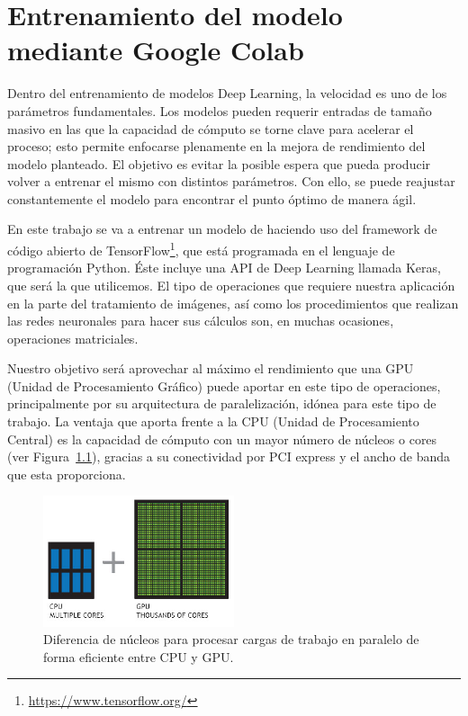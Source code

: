 \mbox{}


\chapter{Entrenamiento del modelo mediante Google Colab}
\label{ch:chapter2}
Dentro del entrenamiento de modelos Deep Learning, la velocidad es uno de los parámetros fundamentales.
Los modelos pueden requerir entradas de tamaño masivo en las que la capacidad de cómputo se torne clave para acelerar el proceso;
esto permite enfocarse plenamente en la mejora de rendimiento del modelo planteado.
El objetivo es evitar la posible espera que pueda producir volver a entrenar el mismo con distintos parámetros.
Con ello, se puede reajustar constantemente el modelo para encontrar el punto óptimo de manera ágil.

En este trabajo se va a entrenar un modelo de  haciendo uso del framework de código abierto de TensorFlow\footnote{\url{https://www.tensorflow.org/}}, que está programada en el lenguaje de programación Python.
Éste incluye una API de Deep Learning llamada Keras, que será la que utilicemos.
El tipo de operaciones que requiere nuestra aplicación en la parte del tratamiento de imágenes, así como los procedimientos que realizan las redes neuronales para hacer sus cálculos son, en muchas ocasiones,
operaciones matriciales.

Nuestro objetivo será aprovechar al máximo el rendimiento que una GPU (Unidad de Procesamiento Gráfico) puede aportar en este tipo de operaciones, principalmente por su arquitectura de paralelización, idónea para este tipo de trabajo.
La ventaja que aporta frente a la CPU (Unidad de Procesamiento Central) es la capacidad de cómputo con un mayor número de núcleos o cores (ver Figura~\ref{fig:Arquitectura de paralelización de una GPU}), gracias a su conectividad por PCI express y el ancho de banda que esta proporciona.

\begin{figure}
    \centering
    \includegraphics[width=0.5\textwidth]{images/chapter2/cpu-and-gpu.jpg}
    \caption{Diferencia de núcleos para procesar cargas de trabajo en paralelo de forma eficiente entre CPU y GPU.}
    \label{fig:Arquitectura de paralelización de una GPU}
\end{figure}


